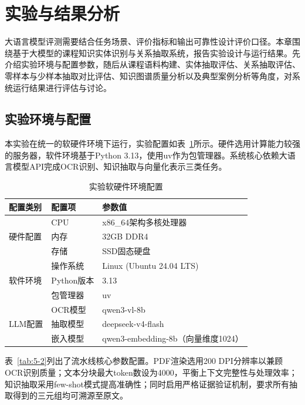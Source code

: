 \section{实验与结果分析}

大语言模型评测需要结合任务场景、评价指标和输出可靠性设计评价口径\cite{luowen2024_llm_eval}。本章围绕基于大模型的课程知识实体识别与关系抽取系统，报告实验设计与运行结果。先介绍实验环境与配置参数，随后从课程语料构建、实体抽取评估、关系抽取评估、零样本与少样本抽取对比评估、知识图谱质量分析以及典型案例分析等角度，对系统运行结果进行评估与讨论。

\subsection{实验环境与配置}

本实验在统一的软硬件环境下运行，实验配置如表~\ref{tab:5-1}所示。硬件选用计算能力较强的服务器，软件环境基于Python 3.13，使用uv作为包管理器。系统核心依赖大语言模型API完成OCR识别、知识抽取与向量化表示三类任务。

\begin{table}[ht]
    \centering
    \caption{实验软硬件环境配置}
    \label{tab:5-1}
    \begin{tabular}{llp{8cm}}
    \toprule
    \textbf{配置类别} & \textbf{配置项} & \textbf{参数值} \\
    \midrule
    \multirow{3}{*}{硬件配置}
    & CPU & x86\_64架构多核处理器 \\
    & 内存 & 32GB DDR4 \\
    & 存储 & SSD固态硬盘 \\
    \midrule
    \multirow{3}{*}{软件环境}
    & 操作系统 & Linux (Ubuntu 24.04 LTS) \\
    & Python版本 & 3.13 \\
    & 包管理器 & uv \\
    \midrule
    \multirow{3}{*}{LLM配置}
    & OCR模型 & qwen3-vl-8b \\
    & 抽取模型 & deepseek-v4-flash \\
    & 嵌入模型 & qwen3-embedding-8b（向量维度1024） \\
    \bottomrule
    \end{tabular}
\end{table}

表~\ref{tab:5-2}列出了流水线核心参数配置。PDF渲染选用200 DPI分辨率以兼顾OCR识别质量；文本分块最大token数设为4000，平衡上下文完整性与处理效率；知识抽取采用few-shot模式提高准确性；同时启用严格证据验证机制，要求所有抽取得到的三元组均可溯源至原文。

